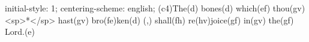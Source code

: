 initial-style: 1;
centering-scheme: english;
(c4)The(d) bones(d) which(ef) thou(gv) <sp>*</sp> hast(gv) bro(fe)ken(d) (,) shall(fh) re(hv)joice(gf) in(gv) the(gf) Lord.(e)
